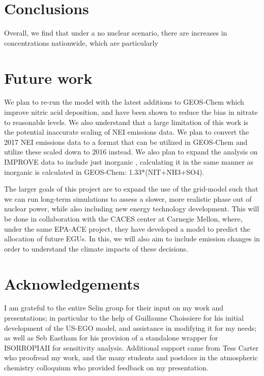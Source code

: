 \documentclass[12]{article}
\begin{document}
\section{Conclusions}
Overall, we find that under a no nuclear scenario, there are increases in  concentrations nationwide, which are particularly 

\section{Future work}
We plan to re-run the model with the latest additions to GEOS-Chem which improve nitric acid deposition, and have been shown to reduce the bias in nitrate to reasonable levels. We also understand that a large limitation of this work is the potential inaccurate scaling of NEI emissions data. We plan to convert the 2017 NEI emissions data to a format that can be utilized in GEOS-Chem and utilize these scaled down to 2016 instead. We also plan to expand the analysis on IMPROVE data to include just inorganic , calculating it in the same manner as inorganic  is calculated in GEOS-Chem: 1.33*(NIT+NH3+SO4). 

The larger goals of this project are to expand the use of the grid-model such that we can run long-term simulations to assess a slower, more realistic phase out of nuclear power, while also including new energy technology development. This will be done in collaboration with the CACES center at Carnegie Mellon, where, under the same EPA-ACE project, they have developed a model to predict the allocation of future EGUs. In this, we will also aim to include  emission changes in order to understand the climate impacts of these decisions.

\section{Acknowledgements}
I am grateful to the entire Selin group for their input on my work and presentations; in particular to the help of Guillaume Choissiere for his initial development of the US-EGO model, and assistance in modifying it for my needs; as well as Seb Eastham for his provision of a standalone wrapper for ISORROPIAII for sensitivity analysis. Additional support came from Tess Carter who proofread my work, and the many students and postdocs in the atmospheric chemistry colloquium who provided feedback on my presentation. 

\pagebreak


\end{document}
